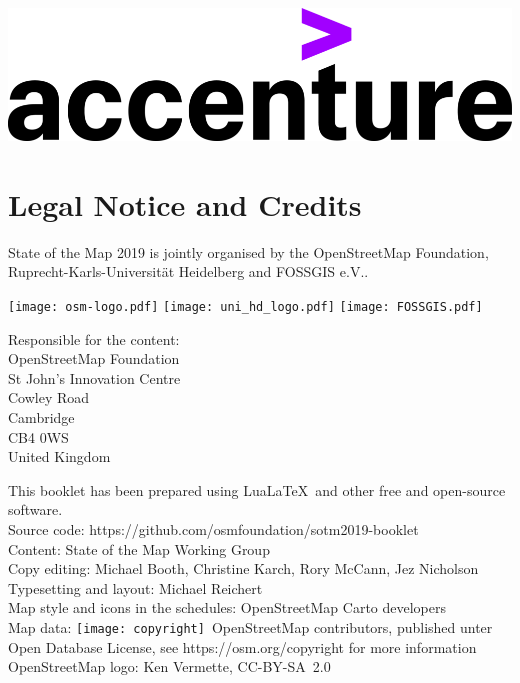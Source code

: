 \newpage
\pagestyle{cropmarksstyle}
\noindent
\vspace{10mm}
\begin{center}
  \includegraphics[width=0.8\linewidth]{sponsors/accenture.png}
\end{center}
\newpage
\null
\newpage

\section*{Legal Notice and Credits}
\label{legal}

\RaggedRight
State of the Map 2019 is jointly organised by the OpenStreetMap Foundation,
Ruprecht-Karls-Universität Heidelberg and FOSSGIS e.V..

\vspace{0.5em}
\newlength\logoHeight
\setlength{\logoHeight}{3.5\baselineskip}
\texttt{[image: osm-logo.pdf]}
\hfill
\texttt{[image: uni\_hd\_logo.pdf]}
\hfill
\texttt{[image: FOSSGIS.pdf]}

\vspace{0.5em}
\noindent Responsible for the content:\\
OpenStreetMap Foundation\\
St John’s Innovation Centre\\
Cowley Road\\
Cambridge\\
CB4 0WS\\
United Kingdom

\vspace{0.5em}
\noindent This booklet has been prepared using Lua\LaTeX\ and 
other free and open-source software.\\
Source code: https://github.com/osmfoundation/sotm2019-booklet\\
Content: State of the Map Working Group\\
Copy editing: Michael Booth, Christine Karch, Rory McCann, Jez Nicholson\\
Typesetting and layout: Michael Reichert\\
Map style and icons in the schedules: OpenStreetMap Carto developers\\
Map data: \texttt{[image: copyright]}~Open\-Street\-Map contributors, published unter Open Database License, see https://osm.org/copyright for more information\\
OpenStreetMap logo: Ken Vermette, CC-BY-SA~2.0

